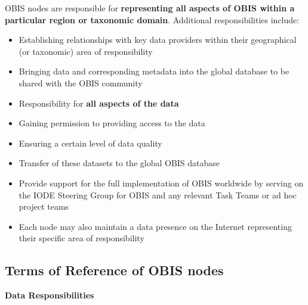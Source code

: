 \documentclass[
  letterpaper,
  DIV=11,
  numbers=noendperiod,
  oneside]{scrreprt}
\providecommand{\tightlist}{%
  \setlength{\itemsep}{0pt}\setlength{\parskip}{0pt}}\usepackage{longtable,booktabs,array}
\begin{document}
OBIS nodes are responsible for \textbf{representing all aspects of OBIS
within a particular region or taxonomic domain}. Additional
responsibilities include:

\begin{itemize}
\tightlist
\item
  Establishing relationships with key data providers within their
  geographical (or taxonomic) area of responsibility
\item
  Bringing data and corresponding metadata into the global database to
  be shared with the OBIS community
\item
  Responsibility for \textbf{all aspects of the data}
\item
  Gaining permission to providing access to the data
\item
  Ensuring a certain level of data quality
\item
  Transfer of these datasets to the global OBIS database
\item
  Provide support for the full implementation of OBIS worldwide by
  serving on the IODE Steering Group for OBIS and any relevant Task
  Teams or ad hoc project teams
\item
  Each node may also maintain a data presence on the Internet
  representing their specific area of responsibility
\end{itemize}

\hypertarget{terms-of-reference-of-obis-nodes}{%
\subsection{Terms of Reference of OBIS
nodes}\label{terms-of-reference-of-obis-nodes}}

\textbf{Data Responsibilities}
\end{document}
